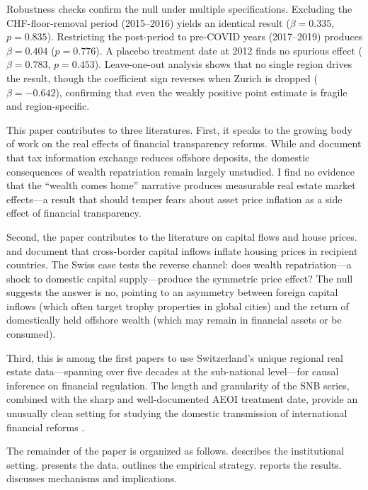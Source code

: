 \documentclass[12pt]{article}
\begin{document}
Robustness checks confirm the null under multiple specifications. Excluding the CHF-floor-removal period (2015--2016) yields an identical result ($\beta = 0.335$, $p = 0.835$). Restricting the post-period to pre-COVID years (2017--2019) produces $\beta = 0.404$ ($p = 0.776$). A placebo treatment date at 2012 finds no spurious effect ($\beta = 0.783$, $p = 0.453$). Leave-one-out analysis shows that no single region drives the result, though the coefficient sign reverses when Zurich is dropped ($\beta = -0.642$), confirming that even the weakly positive point estimate is fragile and region-specific.

This paper contributes to three literatures. First, it speaks to the growing body of work on the real effects of financial transparency reforms. While \citet{johannesen2014tax} and \citet{menkhoff2022tax} document that tax information exchange reduces offshore deposits, the domestic consequences of wealth repatriation remain largely unstudied. I find no evidence that the ``wealth comes home'' narrative produces measurable real estate market effects---a result that should temper fears about asset price inflation as a side effect of financial transparency.

Second, the paper contributes to the literature on capital flows and house prices. \citet{favilukis2021out} and \citet{sa2016effect} document that cross-border capital inflows inflate housing prices in recipient countries. The Swiss case tests the reverse channel: does wealth repatriation---a shock to domestic capital supply---produce the symmetric price effect? The null suggests the answer is no, pointing to an asymmetry between foreign capital inflows (which often target trophy properties in global cities) and the return of domestically held offshore wealth (which may remain in financial assets or be consumed).

Third, this is among the first papers to use Switzerland's unique regional real estate data---spanning over five decades at the sub-national level---for causal inference on financial regulation. The length and granularity of the SNB series, combined with the sharp and well-documented AEOI treatment date, provide an unusually clean setting for studying the domestic transmission of international financial reforms \citep{zucman2013missing, alstadsaeter2019tax}.

The remainder of the paper is organized as follows.  describes the institutional setting.  presents the data.  outlines the empirical strategy.  reports the results.  discusses mechanisms and implications.
\end{document}
